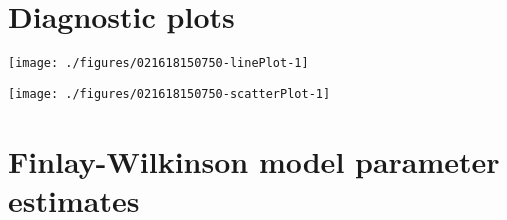 \documentclass[a4paper,11pt]{article}\usepackage[]{graphicx}\usepackage[]{color}
\newenvironment{knitrout}{}{} %
\begin{document}
\clearpage
\section{Diagnostic plots}
\begin{knitrout}
\color{fgcolor}

\texttt{[image: ./figures/021618150750-linePlot-1]} \hfill{}



\end{knitrout}
\clearpage
\begin{knitrout}
\color{fgcolor}
\texttt{[image: ./figures/021618150750-scatterPlot-1]} 

\end{knitrout}
\clearpage

\section{Finlay-Wilkinson model parameter estimates}
\end{document}
